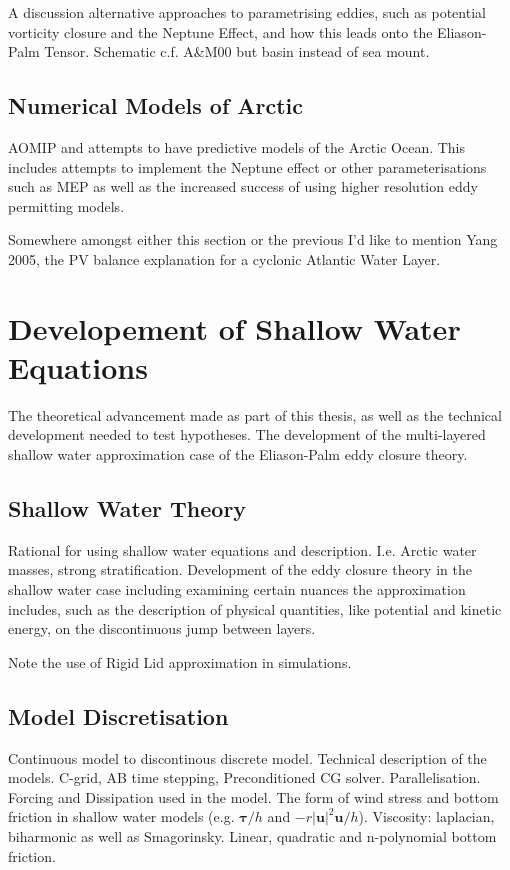 \documentclass[10pt,a4paper]{article}
\begin{document}
A discussion alternative approaches to parametrising eddies,
such as potential vorticity closure  and 
the Neptune Effect, and how this
leads onto the Eliason-Palm Tensor.
Schematic c.f. A\&M00 but basin instead of sea mount.


\subsection{Numerical Models of Arctic}

AOMIP and attempts to have predictive models of the Arctic Ocean. This includes attempts
to implement the Neptune effect or other parameterisations such as MEP as well as
the increased success of using higher resolution eddy permitting models.

Somewhere amongst either this section or the previous I'd like to mention Yang 2005, the 
PV balance explanation for a cyclonic Atlantic Water Layer.

\section{Developement of Shallow Water Equations}

The theoretical advancement made as part of this thesis, as well as the technical development 
needed to test hypotheses. The development of the 
multi-layered  shallow water approximation case of the 
Eliason-Palm eddy closure theory.

\subsection{Shallow Water Theory}

Rational for using shallow water equations and
description. I.e. Arctic water masses, 
strong stratification. Development of the eddy closure theory in the shallow water case
including examining certain nuances the approximation includes, such
as the description of physical quantities, like
potential and kinetic energy, on the discontinuous 
jump between layers.

Note the use of Rigid Lid approximation in
simulations.

\subsection{Model Discretisation}

Continuous model to discontinous discrete model.
Technical description of the models. 
C-grid, AB time stepping, Preconditioned CG solver. 
Parallelisation.
Forcing and Dissipation used in the model.
The form of wind stress and bottom friction in
shallow water models (e.g. $\boldsymbol{\tau}/h$ and 
$-r\left|\boldsymbol{u}\right|^{2}\boldsymbol{u}/h$). Viscosity:
laplacian, biharmonic as well as Smagorinsky.
Linear, quadratic and n-polynomial bottom friction.
\end{document}
